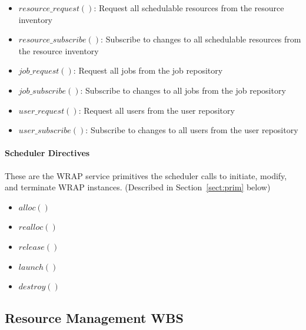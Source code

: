 \begin{itemize}
\item{$resource\_request()$: Request all schedulable resources from
  the resource inventory}
\item{$resource\_subscribe()$: Subscribe to changes to all schedulable
  resources from the resource inventory}
\item{$job\_request()$: Request all jobs from the job repository}
\item{$job\_subscribe()$: Subscribe to changes to all jobs from the
  job repository}
\item{$user\_request()$: Request all users from the user repository}
\item{$user\_subscribe()$: Subscribe to changes to all users from the
  user repository}
\end{itemize}

\paragraph{Scheduler Directives}
These are the WRAP service primitives the scheduler calls to initiate,
modify, and terminate WRAP instances. (Described in
Section~\ref{sect:prim} below)

\begin{itemize}
\item{$alloc()$}
\item{$realloc()$}
\item{$release()$}
\item{$launch()$}
\item{$destroy()$}
\end{itemize}


\subsection{Resource Management WBS}

